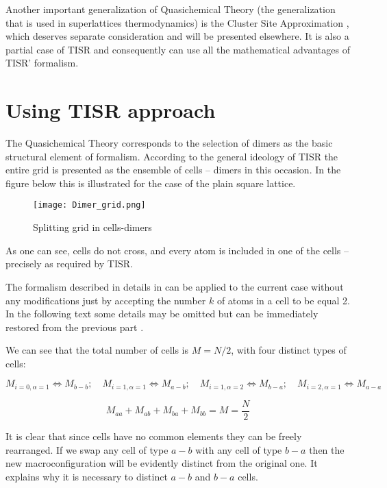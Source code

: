\documentclass[12pt,abstract]{scrartcl}
\begin{document}
Another important generalization of Quasichemical Theory (the generalization that is used in superlattices thermodynamics) is the Cluster Site Approximation \cite{Yang1945,zhang_oates2001}, which deserves separate consideration and will be presented elsewhere. It  is also a partial case of TISR and consequently can use all the mathematical advantages of TISR' formalism.


\section{Using TISR approach}

The Quasichemical Theory corresponds to the selection of dimers as the basic structural element of formalism. According to the general ideology of TISR \cite{TISR_p1} the entire grid is presented as the ensemble of
 cells --    dimers in this occasion. In the figure below this  is illustrated for the case of the plain square lattice.

\begin{figure}[ht]
\texttt{[image: Dimer\_grid.png]}
\centering 
\caption{Splitting grid in cells-dimers}
\label{fig:Splitting}
\end{figure}

As one can see, cells do not cross, and every atom is included in one of the cells -- precisely as required by TISR.

The formalism described in  details in \cite{TISR_p1} can be applied to the current case without any modifications just by accepting the number $k$ of atoms in  a cell to be equal 2. In the following text some details may be omitted but can be immediately restored from the previous part  \cite{TISR_p1}. 

We can see that the total number of cells is $ M = N / 2$, with  four distinct types of cells:

\[
M_{i=0, \alpha=1} \Leftrightarrow M_{b-b}; \quad M_{i=1, \alpha=1}\Leftrightarrow M_{a-b} ; \quad M_{i=1, \alpha=2}\Leftrightarrow M_{b-a} ; \quad M_{i=2, \alpha=1}\Leftrightarrow M_{a-a} 
\]

\begin{equation} \label{Ma-b}
M_{aa} + M_{ab} + M_{ba} + M_{bb} = M = \frac{N}{2}
\end{equation}

It is clear that since cells have no common elements they can be freely rearranged. If we swap any cell of type $a-b$  with any cell of type $b-a$ then the new macroconfiguration will be evidently distinct from the original one. It explains why  it is necessary to distinct $a-b$ and $b-a$ cells.
\end{document}
